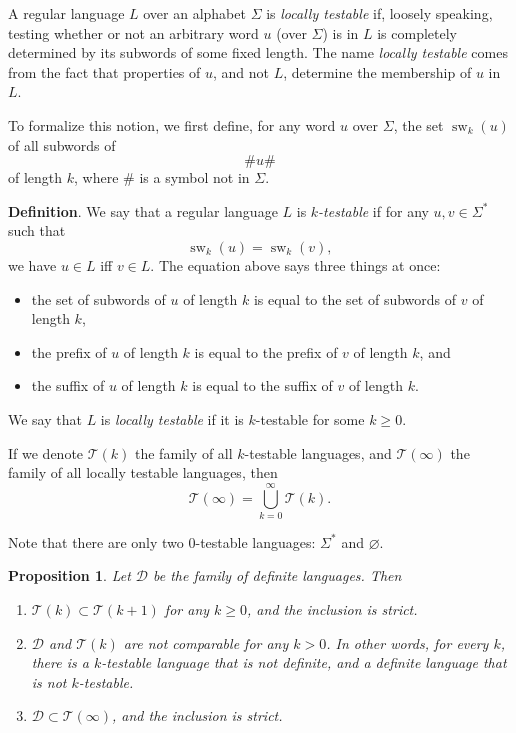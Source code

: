 \documentclass[12pt]{article}
\newtheorem{prop}{Proposition}
\begin{document}
A regular language $L$ over an alphabet $\Sigma$ is \emph{locally testable} if, loosely speaking, testing whether or not an arbitrary word $u$ (over $\Sigma$) is in $L$ is completely determined by its subwords of some fixed length.  The name \emph{locally testable} comes from the fact that properties of $u$, and not $L$, determine the membership of $u$ in $L$.

To formalize this notion, we first define, for any word $u$ over $\Sigma$, the set $\operatorname{sw}_k(u)$ of all subwords of $$\#u\#$$ of length $k$, where $\#$ is a symbol not in $\Sigma$.

\textbf{Definition}.  We say that a regular language $L$ is \emph{$k$-testable} if for any $u,v\in \Sigma^*$ such that $$\operatorname{sw}_k(u)=\operatorname{sw}_k(v),$$ we have $u\in L$ iff $v\in L$.  The equation above says three things at once: 
\begin{itemize}
\item the set of subwords of $u$ of length $k$ is equal to the set of subwords of $v$ of length $k$,
\item the prefix of $u$ of length $k$ is equal to the prefix of $v$ of length $k$, and
\item the suffix of $u$ of length $k$ is equal to the suffix of $v$ of length $k$.
\end{itemize}
We say that $L$ is \emph{locally testable} if it is $k$-testable for some $k\ge 0$.

If we denote $\mathscr{T}(k)$ the family of all $k$-testable languages, and $\mathscr{T}(\infty)$ the family of all locally testable languages, then $$\mathscr{T}(\infty)=\bigcup_{k=0}^{\infty} \mathscr{T}(k).$$

Note that there are only two $0$-testable languages: $\Sigma^*$ and $\varnothing$.

\begin{prop}  Let $\mathscr{D}$ be the family of definite languages.  Then
\begin{enumerate}
\item $\mathscr{T}(k)\subset \mathscr{T}(k+1)$ for any $k\ge 0$, and the inclusion is strict.
\item $\mathscr{D}$ and $\mathscr{T}(k)$ are not comparable for any $k> 0$.  In other words, for every $k$, there is a $k$-testable language that is not definite, and a definite language that is not $k$-testable.
\item $\mathscr{D}\subset \mathscr{T}(\infty)$, and the inclusion is strict.
\end{enumerate}
\end{prop}
\end{document}
